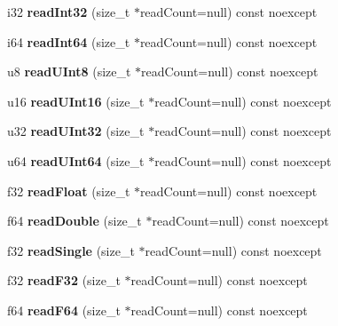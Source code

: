 \begin{DoxyCompactItemize}
i32 {\bfseries read\+Int32} (size\+\_\+t $\ast$read\+Count=null) const noexcept
\item 
\mbox{\label{class_binary_reader_a244551b131cb0bf94bf97c9f39dc1b62}} 
i64 {\bfseries read\+Int64} (size\+\_\+t $\ast$read\+Count=null) const noexcept
\item 
\mbox{\label{class_binary_reader_afec776ab5d3a16a45d73fbb52bf8175d}} 
u8 {\bfseries read\+U\+Int8} (size\+\_\+t $\ast$read\+Count=null) const noexcept
\item 
\mbox{\label{class_binary_reader_aa62994c3c693d4ebdd953019a4ca6c48}} 
u16 {\bfseries read\+U\+Int16} (size\+\_\+t $\ast$read\+Count=null) const noexcept
\item 
\mbox{\label{class_binary_reader_a4c8ded0e86b1286c90526d9a4ca2c9bb}} 
u32 {\bfseries read\+U\+Int32} (size\+\_\+t $\ast$read\+Count=null) const noexcept
\item 
\mbox{\label{class_binary_reader_af5e4c46d2e551091899b62fd7bf73371}} 
u64 {\bfseries read\+U\+Int64} (size\+\_\+t $\ast$read\+Count=null) const noexcept
\item 
\mbox{\label{class_binary_reader_a5967d408635582e3f84dbc1264c8b726}} 
f32 {\bfseries read\+Float} (size\+\_\+t $\ast$read\+Count=null) const noexcept
\item 
\mbox{\label{class_binary_reader_aab964ae1fa070cc26dc1ddec72c959cb}} 
f64 {\bfseries read\+Double} (size\+\_\+t $\ast$read\+Count=null) const noexcept
\item 
\mbox{\label{class_binary_reader_abb48b4b4423fe9ec0159ff5f0e5133ac}} 
f32 {\bfseries read\+Single} (size\+\_\+t $\ast$read\+Count=null) const noexcept
\item 
\mbox{\label{class_binary_reader_a0074a9c28a8d588911e636309fb3ac9a}} 
f32 {\bfseries read\+F32} (size\+\_\+t $\ast$read\+Count=null) const noexcept
\item 
\mbox{\label{class_binary_reader_a301532a049def1389dc936b11fb30cdf}} 
f64 {\bfseries read\+F64} (size\+\_\+t $\ast$read\+Count=null) const noexcept
\end{DoxyCompactItemize}
